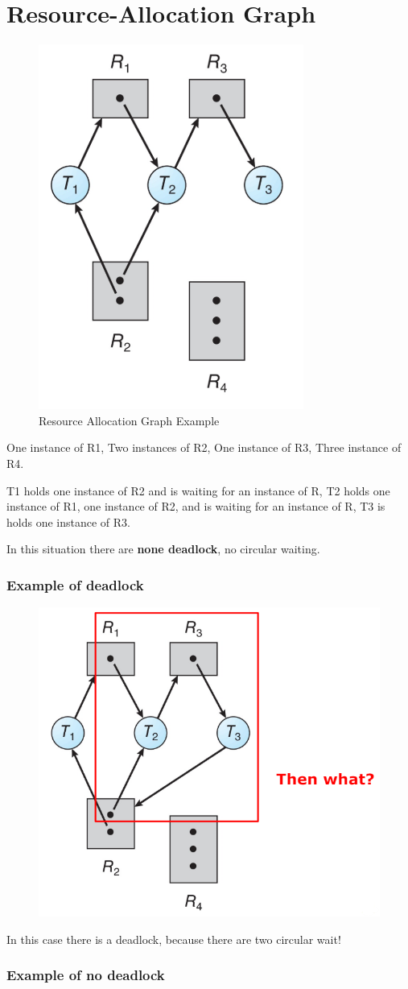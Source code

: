 \newpage
\section{Resource-Allocation Graph}


\begin{figure}[htbp]
    \centering
    \includegraphics[width=0.25\linewidth]{img/garph.png}
    \caption{Resource Allocation Graph Example}
\end{figure}

One instance of R1, Two instances of R2, One instance of R3, Three instance of R4.


T1 holds one instance of R2 and is waiting for an instance of R, T2 holds one instance of R1, one instance of R2, and is waiting for an instance of R, T3 is holds one instance of R3.

In this situation there are \textbf{none deadlock}, no circular waiting.

\subsubsection{Example of deadlock}

\begin{figure}[htbp]
    \centering
    \includegraphics[width=0.4\linewidth]{img/ragWith_dead.png}
\end{figure}

In this case there is a deadlock, because there are two circular wait!


\subsubsection{Example of no deadlock}

